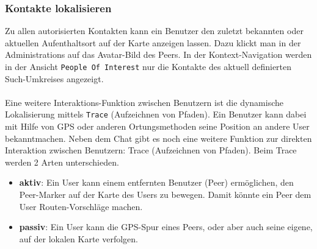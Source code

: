 \subsubsection{Kontakte lokalisieren}
Zu allen autorisierten Kontakten kann ein Benutzer den zuletzt bekannten oder aktuellen Aufenthaltsort auf der Karte anzeigen lassen. Dazu klickt man in der Administrations auf das Avatar-Bild des Peers. In der Kontext-Navigation werden in der Ansicht \texttt{People Of Interest} nur die Kontakte des aktuell definierten Such-Umkreises angezeigt.\\ \\
Eine weitere Interaktions-Funktion zwischen Benutzern ist die dynamische Lokalisierung mittels \texttt{Trace} (Aufzeichnen von Pfaden). Ein Benutzer kann dabei mit Hilfe von GPS oder anderen Ortungsmethoden seine Position an andere User bekanntmachen.
Neben dem Chat gibt es noch eine weitere Funktion zur direkten Interaktion zwischen Benutzern: Trace (Aufzeichnen von Pfaden).
Beim Trace werden 2 Arten unterschieden.
\begin{itemize}
	\item \textbf{aktiv}: Ein User kann einem entfernten Benutzer (Peer) ermöglichen, den Peer-Marker auf der Karte des Users zu bewegen. Damit könnte ein Peer dem User Routen-Vorschläge machen.
	\item \textbf{passiv}: Ein User kann die GPS-Spur eines Peers, oder aber auch seine eigene, auf der lokalen Karte verfolgen.
\end{itemize}
\enlargethispage{3\baselineskip} %
